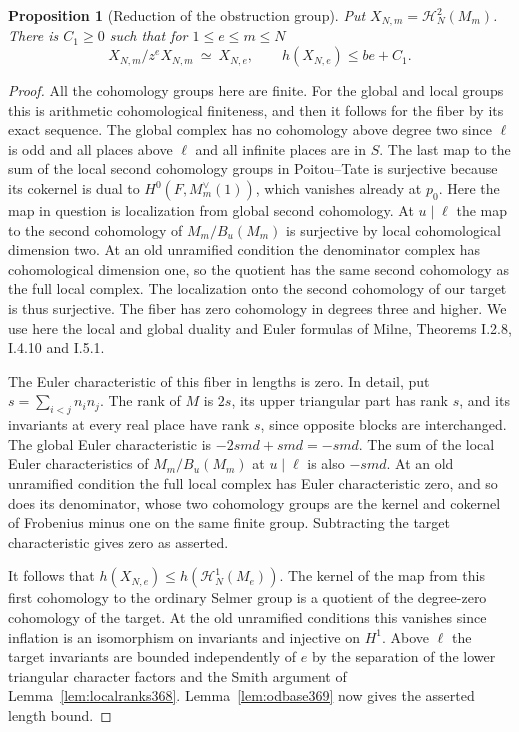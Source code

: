 \documentclass[a4paper,11pt]{article}
\newtheorem{proposition}{Proposition}[section]
\theoremstyle{definition}
\theoremstyle{remark}
\numberwithin{equation}{section}
\begin{document}
\begin{proposition}[Reduction of the obstruction group]
\label{prop:obsquot369}
Put \(X_{N,m}=\mathcal H^2_N(M_m)\). There is \(C_1\ge0\)
such that for \(1\le e\le m\le N\)
\[
 X_{N,m}/z^eX_{N,m}\ \simeq\ X_{N,e},
 \qquad h(X_{N,e})\le be+C_1 .
\]
\end{proposition}
\begin{proof}
All the cohomology groups here are finite. For the global and
local groups this is arithmetic cohomological finiteness,
and then it follows for the fiber by its exact sequence.
The global complex has no cohomology above degree two since
\(\ell\) is odd and all places above \(\ell\) and all infinite
places are in \(S\). The last map to the sum of the local
second cohomology groups in Poitou--Tate is surjective because
its cokernel is dual to \(H^0(F,M_m^\vee(1))\), which vanishes
already at \(p_0\). Here the map in question is localization
from global second cohomology. At \(u\mid\ell\) the map to
the second cohomology of \(M_m/B_u(M_m)\) is surjective
by local cohomological dimension two. At an old unramified
condition the denominator complex has cohomological
dimension one, so the quotient has the same second
cohomology as the full local complex. The localization
onto the second cohomology of our target is thus surjective.
The fiber has zero cohomology in degrees three and higher.
We use here the local and global duality and Euler formulas
of Milne, Theorems I.2.8, I.4.10 and I.5.1.~\cite{VII-V-V-milne98}

The Euler characteristic of this fiber in lengths is zero.
In detail, put \(s=\sum_{i<j}n_i n_j\). The rank of \(M\)
is \(2s\), its upper triangular part has rank \(s\), and its
invariants at every real place have rank \(s\), since opposite
blocks are interchanged. The global Euler characteristic is
\(-2smd+smd=-smd\). The sum of the local Euler
characteristics of \(M_m/B_u(M_m)\) at \(u\mid\ell\) is also
\(-smd\). At an old unramified condition the full local complex
has Euler characteristic zero, and so does its denominator,
whose two cohomology groups are the kernel and cokernel of
Frobenius minus one on the same finite group. Subtracting
the target characteristic gives zero as asserted.

It follows that \(h(X_{N,e})\le h(\mathcal H^1_N(M_e))\).
The kernel of the map from this first cohomology to the
ordinary Selmer group is a quotient of the degree-zero
cohomology of the target. At the old unramified conditions
this vanishes since inflation is an isomorphism on invariants
and injective on \(H^1\). Above \(\ell\) the target
invariants are bounded independently of \(e\) by the
separation of the lower triangular character factors and
the Smith argument of Lemma~\ref{lem:localranks368}.
Lemma~\ref{lem:odbase369} now gives the asserted length bound.


\end{proof}
\end{document}
